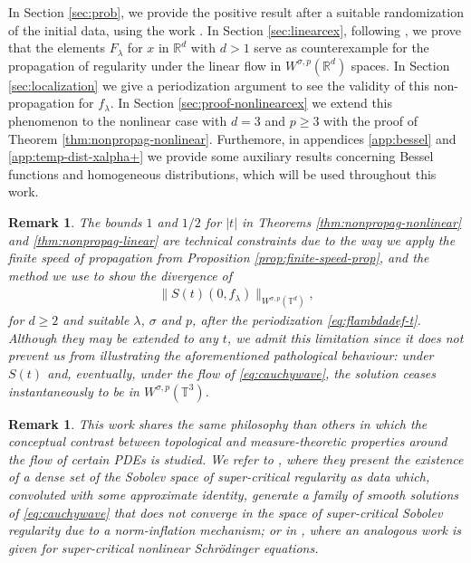 \documentclass[a4paper, reqno, 11pt]{amsart}
\newtheorem{remark}[theorem]{Remark}
\theoremstyle{definition}
\begin{document}
In Section \ref{sec:prob}, we provide the positive result after a suitable randomization of the initial data, using the work \cite{GOTW22}. In Section \ref{sec:linearcex}, following \cite{Peral1980}, we prove that the elements $F_{\lambda}$ for $x$ in $\mathbb{R}^d$ with $d > 1$ serve as counterexample for the propagation of regularity under the linear flow in $W^{\sigma,p}(\mathbb{R}^d)$ spaces. In Section \ref{sec:localization} we give a periodization argument to see the validity of this non-propagation for $f_{\lambda}$. In Section \ref{sec:proof-nonlinearcex} we extend this phenomenon to the nonlinear case with $d=3$ and $p \geq 3$ with the proof of Theorem \ref{thm:nonpropag-nonlinear}. Furthemore, in appendices \ref{app:bessel} and \ref{app:temp-dist-xalpha+} we provide some auxiliary results concerning Bessel functions and homogeneous distributions, which will be used throughout this work.

\begin{remark}
The bounds $1$ and $1/2$ for $|t|$ in Theorems \ref{thm:nonpropag-nonlinear} and \ref{thm:nonpropag-linear} are technical constraints due to the way we apply the finite speed of propagation from Proposition \ref{prop:finite-speed-prop}, and the method we use to show the divergence of
\begin{align*}
\| S(t)(0,f_{\lambda})\|_{W^{\sigma,p}(\mathbb{T}^d)},
\end{align*}
for $d \geq 2$ and suitable $\lambda$, $\sigma$ and $p$, after the periodization \eqref{eq:flambdadef-t}. Although they may be extended to any $t$, we admit this limitation since it does not prevent us from illustrating the aforementioned pathological behaviour: under $S(t)$ and, eventually, under the flow of \eqref{eq:cauchywave}, the solution ceases instantaneously to be in $W^{\sigma,p}(\mathbb{T}^3)$.
\end{remark}

\begin{remark}
This work shares the same philosophy than others in which the conceptual contrast between topological and measure-theoretic properties around the flow of certain PDEs is studied. We refer to \cite{ST20}, where they present the existence of a dense set of the Sobolev space of super-critical regularity as data which, convoluted with some approximate identity, generate a family of smooth solutions of \eqref{eq:cauchywave} that does not converge in the space of super-critical Sobolev regularity due to a norm-inflation mechanism; or in \cite{CG23}, where an analogous work is given for super-critical nonlinear Schrödinger equations.
\end{remark}
\end{document}
